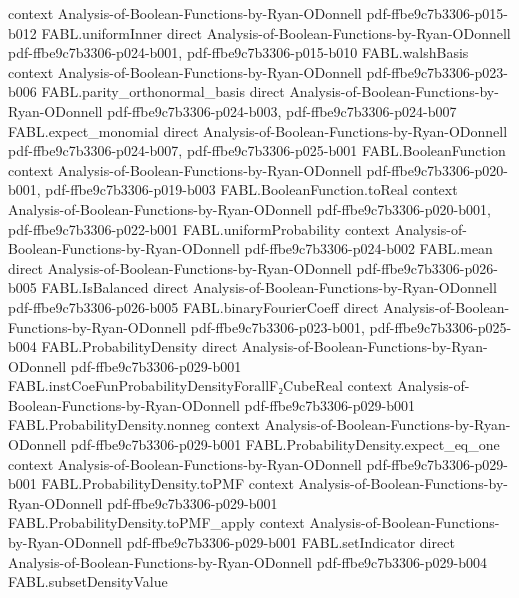\begin{theorem}
  {context}
  {Analysis-of-Boolean-Functions-by-Ryan-ODonnell}
  {pdf-ffbe9c7b3306-p015-b012}
\proofstep
  {FABL.uniformInner}
  {direct}
  {Analysis-of-Boolean-Functions-by-Ryan-ODonnell}
  {pdf-ffbe9c7b3306-p024-b001,
    pdf-ffbe9c7b3306-p015-b010}
\proofstep
  {FABL.walshBasis}
  {context}
  {Analysis-of-Boolean-Functions-by-Ryan-ODonnell}
  {pdf-ffbe9c7b3306-p023-b006}
\proofstep
  {FABL.parity_orthonormal_basis}
  {direct}
  {Analysis-of-Boolean-Functions-by-Ryan-ODonnell}
  {pdf-ffbe9c7b3306-p024-b003,
    pdf-ffbe9c7b3306-p024-b007}
\proofstep
  {FABL.expect_monomial}
  {direct}
  {Analysis-of-Boolean-Functions-by-Ryan-ODonnell}
  {pdf-ffbe9c7b3306-p024-b007,
    pdf-ffbe9c7b3306-p025-b001}
\proofstep
  {FABL.BooleanFunction}
  {context}
  {Analysis-of-Boolean-Functions-by-Ryan-ODonnell}
  {pdf-ffbe9c7b3306-p020-b001,
    pdf-ffbe9c7b3306-p019-b003}
\proofstep
  {FABL.BooleanFunction.toReal}
  {context}
  {Analysis-of-Boolean-Functions-by-Ryan-ODonnell}
  {pdf-ffbe9c7b3306-p020-b001,
    pdf-ffbe9c7b3306-p022-b001}
\proofstep
  {FABL.uniformProbability}
  {context}
  {Analysis-of-Boolean-Functions-by-Ryan-ODonnell}
  {pdf-ffbe9c7b3306-p024-b002}
\proofstep
  {FABL.mean}
  {direct}
  {Analysis-of-Boolean-Functions-by-Ryan-ODonnell}
  {pdf-ffbe9c7b3306-p026-b005}
\proofstep
  {FABL.IsBalanced}
  {direct}
  {Analysis-of-Boolean-Functions-by-Ryan-ODonnell}
  {pdf-ffbe9c7b3306-p026-b005}
\proofstep
  {FABL.binaryFourierCoeff}
  {direct}
  {Analysis-of-Boolean-Functions-by-Ryan-ODonnell}
  {pdf-ffbe9c7b3306-p023-b001,
    pdf-ffbe9c7b3306-p025-b004}
\proofstep
  {FABL.ProbabilityDensity}
  {direct}
  {Analysis-of-Boolean-Functions-by-Ryan-ODonnell}
  {pdf-ffbe9c7b3306-p029-b001}
\proofstep
  {FABL.instCoeFunProbabilityDensityForallF₂CubeReal}
  {context}
  {Analysis-of-Boolean-Functions-by-Ryan-ODonnell}
  {pdf-ffbe9c7b3306-p029-b001}
\proofstep
  {FABL.ProbabilityDensity.nonneg}
  {context}
  {Analysis-of-Boolean-Functions-by-Ryan-ODonnell}
  {pdf-ffbe9c7b3306-p029-b001}
\proofstep
  {FABL.ProbabilityDensity.expect_eq_one}
  {context}
  {Analysis-of-Boolean-Functions-by-Ryan-ODonnell}
  {pdf-ffbe9c7b3306-p029-b001}
\proofstep
  {FABL.ProbabilityDensity.toPMF}
  {context}
  {Analysis-of-Boolean-Functions-by-Ryan-ODonnell}
  {pdf-ffbe9c7b3306-p029-b001}
\proofstep
  {FABL.ProbabilityDensity.toPMF_apply}
  {context}
  {Analysis-of-Boolean-Functions-by-Ryan-ODonnell}
  {pdf-ffbe9c7b3306-p029-b001}
\proofstep
  {FABL.setIndicator}
  {direct}
  {Analysis-of-Boolean-Functions-by-Ryan-ODonnell}
  {pdf-ffbe9c7b3306-p029-b004}
\proofstep
  {FABL.subsetDensityValue}

\end{theorem}
